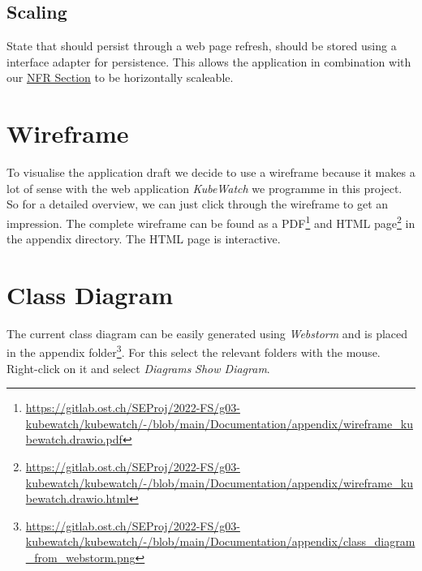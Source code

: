 \subsection{Scaling}

State that should persist through a web page refresh, should be stored using a interface adapter for persistence. This allows the application in combination with our \hyperref[section:non-functional-requirements]{NFR Section} to be horizontally scaleable.

\section{Wireframe}

To visualise the application draft we decide to use a wireframe because it makes a lot of sense with the web application \textit{KubeWatch} we programme in this project. So for a detailed overview, we can just click through the wireframe to get an impression. The complete wireframe can be found as a PDF\footnote{\url{https://gitlab.ost.ch/SEProj/2022-FS/g03-kubewatch/kubewatch/-/blob/main/Documentation/appendix/wireframe_kubewatch.drawio.pdf}} and HTML page\footnote{\url{https://gitlab.ost.ch/SEProj/2022-FS/g03-kubewatch/kubewatch/-/blob/main/Documentation/appendix/wireframe_kubewatch.drawio.html}} in the appendix directory.
The HTML page is interactive.

\section{Class Diagram}
The current class diagram can be easily generated using \textit{Webstorm} and is placed in the appendix folder\footnote{\url{https://gitlab.ost.ch/SEProj/2022-FS/g03-kubewatch/kubewatch/-/blob/main/Documentation/appendix/class_diagram_from_webstorm.png}}.
For this select the relevant folders with the mouse.
Right-click on it and select \textit{Diagrams} \textrightarrow \textit{Show Diagram}.
